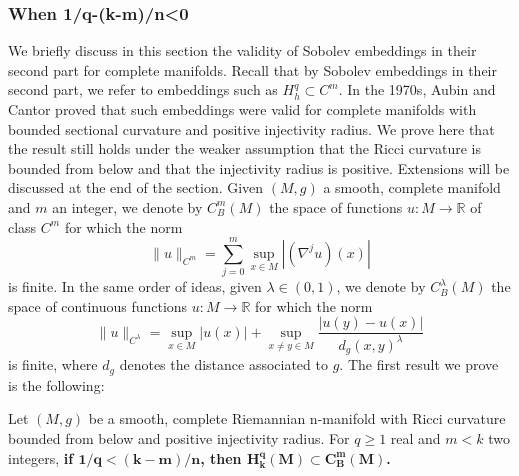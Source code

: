 \documentclass[12pt,hyperref,a4paper,UTF8]{ctexart}
\begin{document}
\subsubsection{When 1/q-(k-m)/n<0}

We briefly discuss in this section the validity of Sobolev embeddings in their second part for complete manifolds. Recall that by Sobolev embeddings in their second part, we refer to embeddings such as $H_h^q \subset C^m$. In the 1970s, Aubin and Cantor proved that such embeddings were valid for complete manifolds with bounded sectional curvature and positive injectivity radius. We prove here that the result still holds under the weaker assumption that the Ricci curvature is bounded from below and that the injectivity radius is positive. Extensions will be discussed at the end of the section. Given $(M, g)$ a smooth, complete manifold and $m$ an integer, we denote by $C_B^m(M)$ the space of functions $u: M \rightarrow \mathbb{R}$ of class $C^m$ for which the norm
$$
\|u\|_{C^m}=\sum_{j=0}^m \sup _{x \in M}\left|\left(\nabla^j u\right)(x)\right|
$$
is finite. In the same order of ideas, given $\lambda \in(0,1)$, we denote by $C_B^\lambda(M)$ the space of continuous functions $u: M \rightarrow \mathbb{R}$ for which the norm
$$
\|u\|_{C^\lambda}=\sup _{x \in M}|u(x)|+\sup _{x \neq y \in M} \frac{|u(y)-u(x)|}{d_g(x, y)^\lambda}
$$
is finite, where $d_g$ denotes the distance associated to $g$. The first result we prove is the following:

\begin{Theorem}
    Let $(M, g)$ be a smooth, complete Riemannian n-manifold with Ricci curvature bounded from below and positive injectivity radius. For $q \geq 1$ real and $m<k$ two integers, \textbf{if $\bm{1 / q<(k-m) / n}$, then $\bm{H_k^q(M) \subset C_B^m(M)}$.}
\label{thm44}
\end{Theorem}
\end{document}
